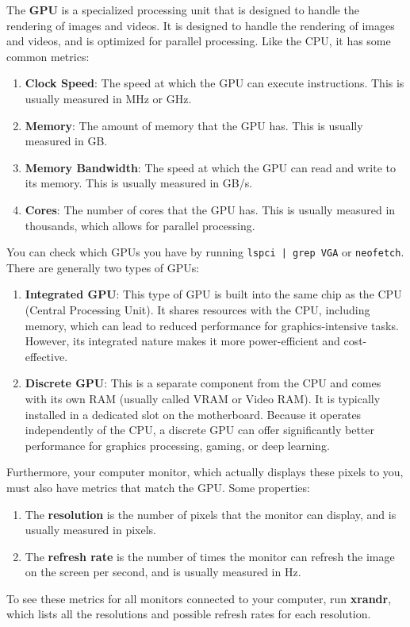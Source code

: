 \documentclass{article}
\begin{document}
    \begin{definition}
      The \textbf{GPU} is a specialized processing unit that is designed to handle the rendering of images and videos. It is designed to handle the rendering of images and videos, and is optimized for parallel processing. Like the CPU, it has some common metrics: 
      \begin{enumerate} 
        \item \textbf{Clock Speed}: The speed at which the GPU can execute instructions. This is usually measured in MHz or GHz. 
        \item \textbf{Memory}: The amount of memory that the GPU has. This is usually measured in GB. 
        \item \textbf{Memory Bandwidth}: The speed at which the GPU can read and write to its memory. This is usually measured in GB/s. 
        \item \textbf{Cores}: The number of cores that the GPU has. This is usually measured in thousands, which allows for parallel processing. 
      \end{enumerate}
      You can check which GPUs you have by running \texttt{lspci | grep VGA} or \texttt{neofetch}. There are generally two types of GPUs: 
      \begin{enumerate} 
        \item \textbf{Integrated GPU}: This type of GPU is built into the same chip as the CPU (Central Processing Unit). It shares resources with the CPU, including memory, which can lead to reduced performance for graphics-intensive tasks. However, its integrated nature makes it more power-efficient and cost-effective. 
        \item \textbf{Discrete GPU}: This is a separate component from the CPU and comes with its own RAM (usually called VRAM or Video RAM). It is typically installed in a dedicated slot on the motherboard. Because it operates independently of the CPU, a discrete GPU can offer significantly better performance for graphics processing, gaming, or deep learning. 
      \end{enumerate}
    \end{definition}

    \begin{definition}[Monitor]
      Furthermore, your computer monitor, which actually displays these pixels to you, must also have metrics that match the GPU. Some properties: 
      \begin{enumerate} 
        \item The \textbf{resolution} is the number of pixels that the monitor can display, and is usually measured in pixels. 
        \item The \textbf{refresh rate} is the number of times the monitor can refresh the image on the screen per second, and is usually measured in Hz. 
      \end{enumerate}
      To see these metrics for all monitors connected to your computer, run \textbf{xrandr}, which lists all the resolutions and possible refresh rates for each resolution. 
    \end{definition}
\end{document}
